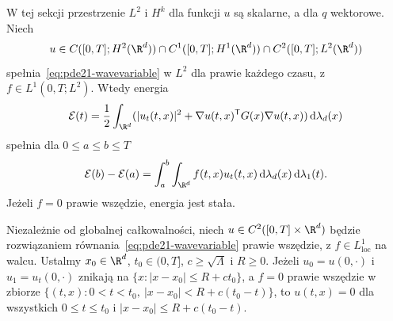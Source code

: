 \begin{twierdzenie}\label{thm:pde21-wave-energy}
W tej sekcji przestrzenie $L^2$ i $H^k$
dla funkcji $u$ są skalarne, a dla $q$ wektorowe.
Niech
\[
 u\in C([0,T];H^2(\R^d))\cap C^1([0,T];H^1(\R^d))
       \cap C^2([0,T];L^2(\R^d))
\]
spełnia~\eqref{eq:pde21-wavevariable} w $L^2$
dla prawie każdego czasu, z $f\in L^1(0,T;L^2)$.
Wtedy energia
\[
 \mathcal E(t)=\frac12\int_{\R^d}
 (|u_t(t,x)|^2+\nabla u(t,x)^\mathsf TG(x)\nabla u(t,x))
 \,\mathrm d\lambda_d(x)
\]
spełnia dla $0\le a\le b\le T$
\[
 \mathcal E(b)-\mathcal E(a)
 =\int_a^b\int_{\R^d}f(t,x)u_t(t,x)
 \,\mathrm d\lambda_d(x)\,\mathrm d\lambda_1(t).
\]
Jeżeli $f=0$ prawie wszędzie, energia jest stała.

Niezależnie od globalnej całkowalności, niech
$u\in C^2([0,T]\times\R^d)$ będzie rozwiązaniem
równania~\eqref{eq:pde21-wavevariable} prawie wszędzie,
z $f\in L^1_{\mathrm{loc}}$ na walcu.
Ustalmy $x_0\in\R^d$, $t_0\in(0,T]$,
$c\ge\sqrt{\Lambda}$ i $R\ge0$.
Jeżeli $u_0=u(0,\cdot)$ i $u_1=u_t(0,\cdot)$
znikają na $\{x:|x-x_0|\le R+ct_0\}$, a $f=0$
prawie wszędzie w zbiorze
$\{(t,x):0<t<t_0,\ |x-x_0|<R+c(t_0-t)\}$,
to $u(t,x)=0$ dla wszystkich
$0\le t\le t_0$ i $|x-x_0|\le R+c(t_0-t)$.
\end{twierdzenie}
